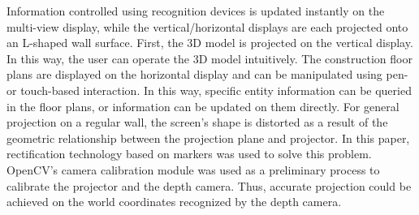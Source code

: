 Information controlled using recognition devices is updated instantly on the multi-view display, while the vertical/horizontal displays are each projected onto an L-shaped wall surface. First, the 3D model is projected on the vertical display. In this way, the user can operate the 3D model intuitively. The construction floor plans are displayed on the horizontal display and can be manipulated using pen- or touch-based interaction. In this way, specific entity information can be queried in the floor plans, or information can be updated on them directly. For general projection on a regular wall, the screen's shape is distorted as a result of the geometric relationship between the projection plane and projector. In this paper, rectification technology based on markers was used to solve this problem. OpenCV's camera calibration module was used as a preliminary process to calibrate the projector and the depth camera. Thus, accurate projection could be achieved on the world coordinates recognized by the depth camera.

